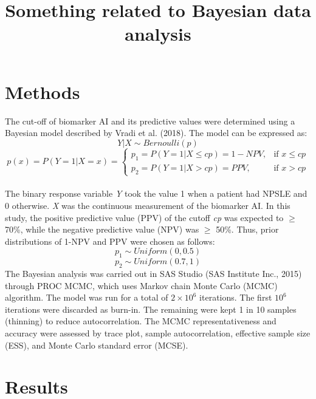 \documentclass[]{elsarticle} %
\begin{document}
\begin{frontmatter}

  \title{Something related to Bayesian data analysis}
      
  \begin{abstract}
  
  \end{abstract}
  
 \end{frontmatter}

\section{Methods}\label{methods}

The cut-off of biomarker AI and its predictive values were determined
using a Bayesian model described by Vradi et al. (2018). The model can
be expressed as:\\
\[Y|X \sim Bernoulli(p)\] \[
p(x) = P(Y = 1|X = x) = 
\left\{
    \begin{array}{lr}
          p_1 = P(Y = 1|X \le cp) = 1 - NPV, & \text{if } x \le cp\\
          p_2 = P(Y = 1|X > cp) = PPV, & \text{if } x > cp
    \end{array}
\right.
\]\\
The binary response variable \emph{Y} took the value 1 when a patient
had NPSLE and 0 otherwise. \emph{X} was the continuous measurement of
the biomarker AI. In this study, the positive predictive value (PPV) of
the cutoff \emph{cp} was expected to \(\ge\) 70\%, while the negative
predictive value (NPV) was \(\ge\) 50\%. Thus, prior distributions of
1-NPV and PPV were chosen as follows: \[p_1 \sim Uniform(0, 0.5)\]
\[p_2 \sim Uniform(0.7, 1)\] The Bayesian analysis was carried out in
SAS Studio (SAS Institute Inc., 2015) through PROC MCMC, which uses
Markov chain Monte Carlo (MCMC) algorithm. The model was run for a total
of \ensuremath{2\times 10^{6}} iterations. The first \ensuremath{10^{6}}
iterations were discarded as burn-in. The remaining were kept 1 in 10
samples (thinning) to reduce autocorrelation. The MCMC
representativeness and accuracy were assessed by trace plot, sample
autocorrelation, effective sample size (ESS), and Monte Carlo standard
error (MCSE).

\section{Results}\label{results}
\end{document}
